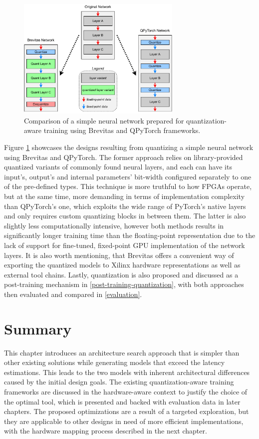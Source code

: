 \begin{figure}[hpt!]
  \centering
  \includegraphics[trim={0cm 0cm 0cm 0cm}, width=0.7\textwidth, center]{models/pre-training-quantization.pdf}
  \caption{Comparison of a simple neural network prepared for quantization-aware training using Brevitas and QPyTorch frameworks.}
  \label{fig:pre-training-quantization}
\end{figure}

Figure \ref{fig:pre-training-quantization} showcases the designs resulting from quantizing a simple neural network using Brevitas and QPyTorch. The former approach relies on library-provided quantized variants of commonly found neural layers, and each can have its input's, output's and internal parameters' bit-width configured separately to one of the pre-defined types. This technique is more truthful to how FPGAs operate, but at the same time, more demanding in terms of implementation complexity than QPyTorch's one, which exploits the wide range of PyTorch's native layers and only requires custom quantizing blocks in between them. The latter is also slightly less computationally intensive, however both methods results in significantly longer training time than the floating-point representation due to the lack of support for fine-tuned, fixed-point GPU implementation of the network layers. It is also worth mentioning, that Brevitas offers a convenient way of exporting the quantized models to Xilinx hardware representations as well as external tool chains. Lastly, quantization is also proposed and discussed as a post-training mechanism in \cref{post-training-quantization}, with both approaches then evaluated and compared in \cref{evaluation}.

\section{Summary}
This chapter introduces an architecture search approach that is simpler than other existing solutions \cite{95-qi2021trim:} while generating models that exceed the latency estimations. This leads to the two models with inherent architectural differences caused by the initial design goals. The existing quantization-aware training frameworks are discussed in the hardware-aware context to justify the choice of the optimal tool, which is presented and backed with evaluation data in later chapters. The proposed optimizations are a result of a targeted exploration, but they are applicable to other designs in need of more efficient implementations, with the hardware mapping process described in the next chapter.

